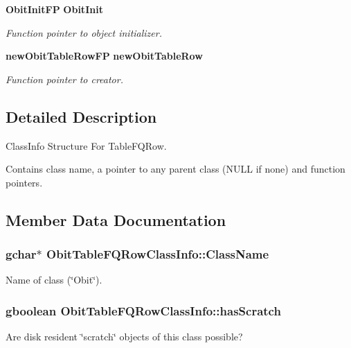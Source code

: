 \begin{CompactItemize}
{\bf Obit\-Init\-FP} {\bf Obit\-Init}
\begin{CompactList}\small\item\em Function pointer to object initializer. \item\end{CompactList}\item 
{\bf new\-Obit\-Table\-Row\-FP} {\bf new\-Obit\-Table\-Row}
\begin{CompactList}\small\item\em Function pointer to creator. \item\end{CompactList}\end{CompactItemize}


\subsection{Detailed Description}
Class\-Info Structure For Table\-FQRow. 

Contains class name, a pointer to any parent class (NULL if none) and function pointers. 



\subsection{Member Data Documentation}
\subsubsection{\setlength{\rightskip}{0pt plus 5cm}gchar$\ast$ {\bf Obit\-Table\-FQRow\-Class\-Info::Class\-Name}}\label{structObitTableFQRowClassInfo_o2}


Name of class (\char`\"{}Obit\char`\"{}). 

\subsubsection{\setlength{\rightskip}{0pt plus 5cm}gboolean {\bf Obit\-Table\-FQRow\-Class\-Info::has\-Scratch}}\label{structObitTableFQRowClassInfo_o1}


Are disk resident \char`\"{}scratch\char`\"{} objects of this class possible? 

